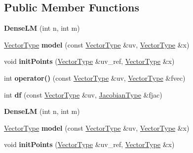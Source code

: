 \subsection*{Public Member Functions}
\begin{DoxyCompactItemize}
\item 
\mbox{\label{struct_dense_l_m_a5f975a8b7b463680c2f661b3d539498c}} 
{\bfseries Dense\+LM} (int n, int m)
\item 
\mbox{\label{struct_dense_l_m_a89459c16a26db0b6bea4483cdeb9c53f}} 
\hyperlink{group___core___module}{Vector\+Type} {\bfseries model} (const \hyperlink{group___core___module}{Vector\+Type} \&uv, \hyperlink{group___core___module}{Vector\+Type} \&x)
\item 
\mbox{\label{struct_dense_l_m_af20260760bea16b0e6fff258feedf0dd}} 
void {\bfseries init\+Points} (\hyperlink{group___core___module}{Vector\+Type} \&uv\+\_\+ref, \hyperlink{group___core___module}{Vector\+Type} \&x)
\item 
\mbox{\label{struct_dense_l_m_a3aa5ba22b1ee82c0a94514223ef03d36}} 
int {\bfseries operator()} (const \hyperlink{group___core___module}{Vector\+Type} \&uv, \hyperlink{group___core___module}{Vector\+Type} \&fvec)
\item 
\mbox{\label{struct_dense_l_m_a73b1a304a40e5b675857afd929c793b1}} 
int {\bfseries df} (const \hyperlink{group___core___module}{Vector\+Type} \&uv, \hyperlink{group___core___module_class_eigen_1_1_matrix}{Jacobian\+Type} \&fjac)
\item 
\mbox{\label{struct_dense_l_m_a5f975a8b7b463680c2f661b3d539498c}} 
{\bfseries Dense\+LM} (int n, int m)
\item 
\mbox{\label{struct_dense_l_m_a89459c16a26db0b6bea4483cdeb9c53f}} 
\hyperlink{group___core___module}{Vector\+Type} {\bfseries model} (const \hyperlink{group___core___module}{Vector\+Type} \&uv, \hyperlink{group___core___module}{Vector\+Type} \&x)
\item 
\mbox{\label{struct_dense_l_m_af20260760bea16b0e6fff258feedf0dd}} 
void {\bfseries init\+Points} (\hyperlink{group___core___module}{Vector\+Type} \&uv\+\_\+ref, \hyperlink{group___core___module}{Vector\+Type} \&x)

\end{DoxyCompactItemize}
